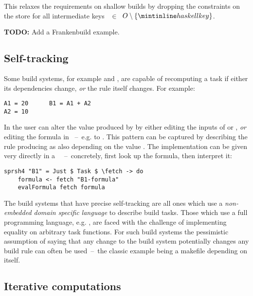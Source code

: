 \noindent
This relaxes the requirements on shallow builds by dropping the constraints on
the  store for all intermediate keys ~$\in$~$O\setminus \{\hs{key}\}$.

\textbf{TODO:} Add a Frankenbuild example.

\subsection{Self-tracking}\label{sec-tracking-aspects}

Some build systems, for example \Excel and \Ninja, are capable of recomputing a
task if either its dependencies change, \emph{or} the rule itself changes. For
example:

\vspace{0.5mm}
\begin{verbatim}
A1 = 20      B1 = A1 + A2
A2 = 10
\end{verbatim}
\vspace{0.5mm}

\noindent
In \Excel the user can alter the value produced by  by either editing
the inputs of  or , \emph{or} editing the formula in
~--~e.g. to . This pattern can be captured by describing
the rule producing  as also depending on the value .
The implementation can be given very directly in a
~~--~concretely, first look up the formula, then interpret
it:

\vspace{0.5mm}
\begin{verbatim}
sprsh4 "B1" = Just $ Task $ \fetch -> do
    formula <- fetch "B1-formula"
    evalFormula fetch formula
\end{verbatim}
\vspace{0.5mm}

\noindent
The build systems that have precise self-tracking are all ones which use a
\emph{non-embedded domain specific language} to describe build tasks. Those
which use a full programming language, e.g. \Shake, are faced with the challenge
of implementing equality on arbitrary task functions. For such build systems the
pessimistic assumption of saying that any change to the build system potentially
changes any build rule can often be used~--~the classic example being a makefile
depending on itself.

\subsection{Iterative computations}\label{sec-iterative-compute}

